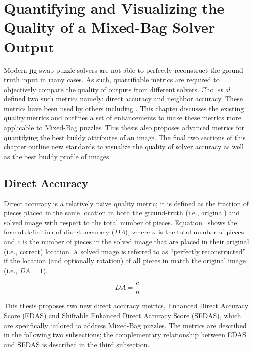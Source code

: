 \chapter{Quantifying and Visualizing the Quality of a Mixed-Bag Solver Output}\label{chap:quantifyingSolverQuantify}

Modern jig swap puzzle solvers are not able to perfectly reconstruct the ground-truth input in many cases.  As such, quantifiable metrics are required to objectively compare the quality of outputs from different solvers.  Cho~\textit{et al.}~\cite{cho2010} defined two such metrics namely: direct accuracy and neighbor accuracy. These metrics have been used by others including \cite{sholomon2013, pomeranz2011, paikin2015, son2014, gallagher2012}.  This chapter discusses the existing quality metrics and outlines a set of enhancements to make these metrics more applicable to Mixed-Bag puzzles.  This thesis also proposes advanced metrics for quantifying the best buddy attributes of an image.  The final two sections of this chapter outline new standards to visualize the quality of solver accuracy as well as the best buddy profile of images.

\section{Direct Accuracy}\label{sec:directAccuracy}

Direct accuracy is a relatively na\"{\i}ve quality metric; it is defined as the fraction of pieces placed in the same location in both the ground-truth (i.e., original) and solved image with respect to the total number of pieces. Equation~ shows the formal definition of direct accuracy ($DA$), where $n$ is the total number of pieces and $c$ is the number of pieces in the solved image that are placed in their original (i.e., correct) location.  A solved image is referred to as ``perfectly reconstructed'' if the location (and optionally rotation) of all pieces in match the original image (i.e., $DA=1$).

\begin{equation} \label{eq:directAccuracy}
DA = \frac{c}{n}
\end{equation}

This thesis proposes two new direct accuracy metrics, Enhanced Direct Accuracy Score (EDAS) and Shiftable Enhanced Direct Accuracy Score (SEDAS), which are specifically tailored to address Mixed-Bag puzzles.  The metrics are described in the following two subsections; the complementary relationship between EDAS and SEDAS is described in the third subsection.

